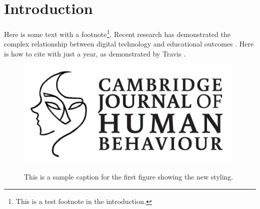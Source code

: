\documentclass[12pt]{article}
\begin{document}
\section{Introduction}
\begin{sectiontext}
Here is some text with a footnote\footnote{This is a test footnote in the introduction.}. Recent research has demonstrated the complex relationship between digital technology and educational outcomes \parencite{patel2023divide}. Here is how to cite with just a year, as demonstrated by Travis \parencite{2023}. \lipsum

\begin{figure}
    \caption{This is a sample caption for the first figure showing the new styling.}
    \includegraphics[width=\linewidth]{article_upper_logo.png}
    \label{fig:first}
\end{figure}


\end{sectiontext}
\end{document}
